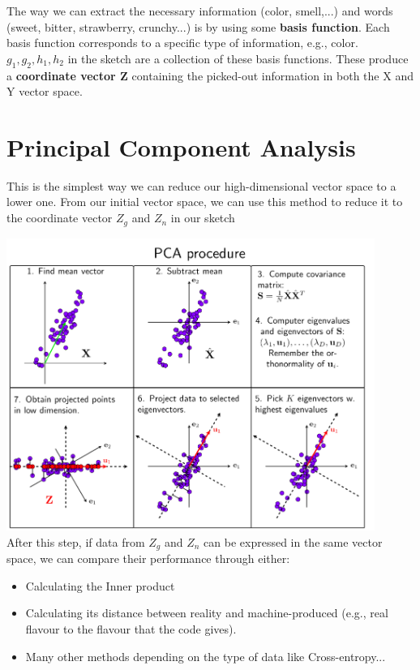 \documentclass{article}
\begin{document}
The way we can extract the necessary information (color, smell,...) and words (sweet, bitter, strawberry, crunchy...) is by using some \textbf{basis function}. Each basis function corresponds to a specific type of information, e.g., color. \textbf{$g_1, g_2, h_1, h_2$} in the sketch are a collection of these basis functions. These produce a \textbf{coordinate vector Z} containing the picked-out information in both the X and Y vector space.

\section{Principal Component Analysis}

This is the simplest way we can reduce our high-dimensional vector space to a lower one. From our initial vector space, we can use this method to reduce it to the coordinate vector $Z_g$ and $Z_n$ in our sketch

\includegraphics[width=12cm]{Capture.PNG}\\

After this step, if data from $Z_g$ and $Z_n$ can be expressed in the same vector space, we can compare their performance through either:
\begin{itemize}
  \item Calculating the Inner product 
  \item Calculating its distance between reality and machine-produced (e.g., real flavour to the flavour that the code gives).
  \item Many other methods depending on the type of data like Cross-entropy...
\end{itemize}
\end{document}
